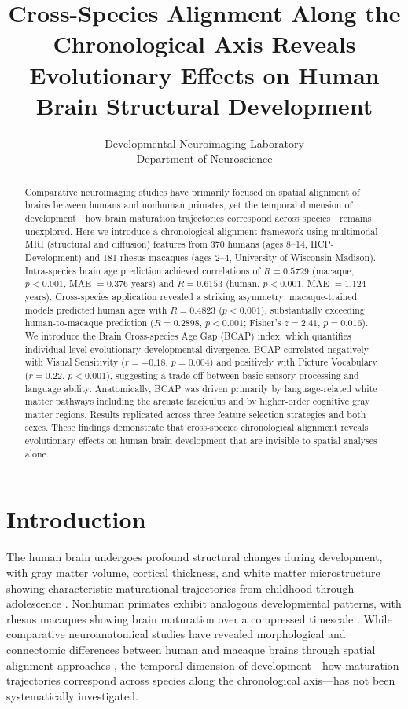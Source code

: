 \documentclass[11pt]{article}
\title{Cross-Species Alignment Along the Chronological Axis Reveals Evolutionary Effects on Human Brain Structural Development}
\author{
Developmental Neuroimaging Laboratory\\
Department of Neuroscience\\
}
\date{}
\begin{document}
\maketitle

\begin{abstract}
Comparative neuroimaging studies have primarily focused on spatial alignment of brains between humans and nonhuman primates, yet the temporal dimension of development---how brain maturation trajectories correspond across species---remains unexplored. Here we introduce a chronological alignment framework using multimodal MRI (structural and diffusion) features from 370 humans (ages 8--14, HCP-Development) and 181 rhesus macaques (ages 2--4, University of Wisconsin-Madison). Intra-species brain age prediction achieved correlations of $R = 0.5729$ (macaque, $p < 0.001$, MAE $= 0.376$ years) and $R = 0.6153$ (human, $p < 0.001$, MAE $= 1.124$ years). Cross-species application revealed a striking asymmetry: macaque-trained models predicted human ages with $R = 0.4823$ ($p < 0.001$), substantially exceeding human-to-macaque prediction ($R = 0.2898$, $p < 0.001$; Fisher's $z = 2.41$, $p = 0.016$). We introduce the Brain Cross-species Age Gap (BCAP) index, which quantifies individual-level evolutionary developmental divergence. BCAP correlated negatively with Visual Sensitivity ($r = -0.18$, $p = 0.004$) and positively with Picture Vocabulary ($r = 0.22$, $p < 0.001$), suggesting a trade-off between basic sensory processing and language ability. Anatomically, BCAP was driven primarily by language-related white matter pathways including the arcuate fasciculus and by higher-order cognitive gray matter regions. Results replicated across three feature selection strategies and both sexes. These findings demonstrate that cross-species chronological alignment reveals evolutionary effects on human brain development that are invisible to spatial analyses alone.
\end{abstract}

\section{Introduction}

The human brain undergoes profound structural changes during development, with gray matter volume, cortical thickness, and white matter microstructure showing characteristic maturational trajectories from childhood through adolescence \citep{mills2016structural, lebel2012diffusion}. Nonhuman primates exhibit analogous developmental patterns, with rhesus macaques showing brain maturation over a compressed timescale \citep{hill2010similar}. While comparative neuroanatomical studies have revealed morphological and connectomic differences between human and macaque brains through spatial alignment approaches \citep{xu2020cross, seidlitz2018morphometric, reardon2018normative}, the temporal dimension of development---how maturation trajectories correspond across species along the chronological axis---has not been systematically investigated.
\end{document}
